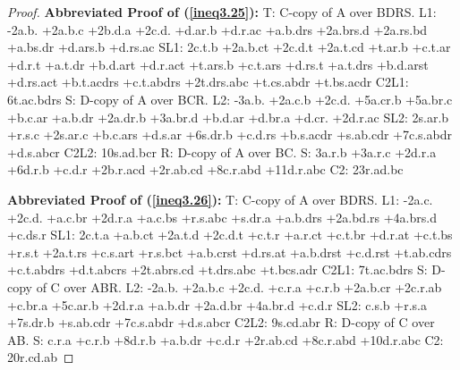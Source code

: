 \documentclass[10pt,journal]{IEEEtran}
\begin{document}
\begin{proof}
{\bf Abbreviated Proof of (\ref{ineq3.25}):}
T: C-copy of A over BDRS.\newline
L1: -2a.b. +2a.b.c +2b.d.a +2c.d. +d.ar.b +d.r.ac +a.b.drs +2a.brs.d +2a.rs.bd +a.bs.dr +d.ars.b +d.rs.ac\newline
SL1: 2c.t.b +2a.b.ct +2c.d.t +2a.t.cd +t.ar.b +c.t.ar +d.r.t +a.t.dr +b.d.art +d.r.act +t.ars.b +c.t.ars +d.rs.t +a.t.drs +b.d.arst +d.rs.act +b.t.acdrs +c.t.abdrs +2t.drs.abc +t.cs.abdr +t.bs.acdr
C2L1: 6t.ac.bdrs\newline
S: D-copy of A over BCR.\newline
L2: -3a.b. +2a.c.b +2c.d. +5a.cr.b +5a.br.c +b.c.ar +a.b.dr +2a.dr.b +3a.br.d +b.d.ar +d.br.a +d.cr. +2d.r.ac\newline
SL2: 2s.ar.b +r.s.c +2s.ar.c +b.c.ars +d.s.ar +6s.dr.b +c.d.rs +b.s.acdr +s.ab.cdr +7c.s.abdr +d.s.abcr\newline
C2L2: 10s.ad.bcr\newline
R: D-copy of A over BC.\newline
S: 3a.r.b +3a.r.c +2d.r.a +6d.r.b +c.d.r +2b.r.acd +2r.ab.cd +8c.r.abd +11d.r.abc\newline
C2: 23r.ad.bc\newline


{\bf Abbreviated Proof of (\ref{ineq3.26}):}
T: C-copy of A over BDRS.\newline
L1: -2a.c. +2c.d. +a.c.br +2d.r.a +a.c.bs +r.s.abc +s.dr.a +a.b.drs +2a.bd.rs +4a.brs.d +c.ds.r\newline
SL1: 2c.t.a +a.b.ct +2a.t.d +2c.d.t +c.t.r +a.r.ct +c.t.br +d.r.at +c.t.bs +r.s.t +2a.t.rs +c.s.art +r.s.bct +a.b.crst +d.rs.at +a.b.drst +c.d.rst +t.ab.cdrs +c.t.abdrs +d.t.abcrs +2t.abrs.cd +t.drs.abc +t.bcs.adr
C2L1: 7t.ac.bdrs\newline
S: D-copy of C over ABR.\newline
L2: -2a.b. +2a.b.c +2c.d. +c.r.a +c.r.b +2a.b.cr +2c.r.ab +c.br.a +5c.ar.b +2d.r.a +a.b.dr +2a.d.br +4a.br.d +c.d.r\newline
SL2: c.s.b +r.s.a +7s.dr.b +s.ab.cdr +7c.s.abdr +d.s.abcr\newline
C2L2: 9s.cd.abr\newline
R: D-copy of C over AB.\newline
S: c.r.a +c.r.b +8d.r.b +a.b.dr +c.d.r +2r.ab.cd +8c.r.abd +10d.r.abc\newline
C2: 20r.cd.ab\newline


\end{proof}
\end{document}
